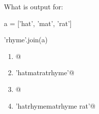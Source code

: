 \question
What is output for:

a = ['hat', 'mat', 'rat']

'rhyme'.join(a)

\begin{enumerate}
\item {}@
\item \lstinline@'hatmatratrhyme'@
\item {}@
\item \lstinline@'hatrhymematrhyme rat'@
\end{enumerate}

